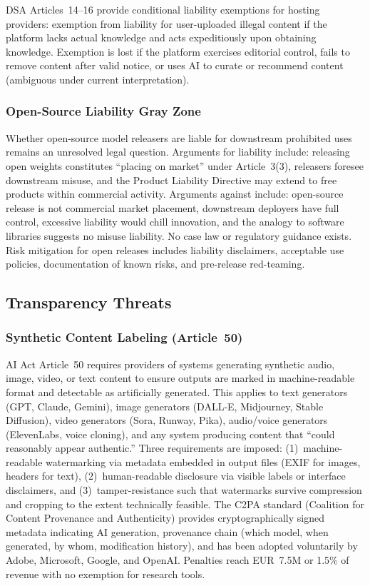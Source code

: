 \documentclass[11pt,a4paper]{article}
\begin{document}
DSA Articles~14--16 provide conditional liability exemptions for hosting providers: exemption from liability for user-uploaded illegal content if the platform lacks actual knowledge and acts expeditiously upon obtaining knowledge. Exemption is lost if the platform exercises editorial control, fails to remove content after valid notice, or uses AI to curate or recommend content (ambiguous under current interpretation).

\subsubsection{Open-Source Liability Gray Zone}

Whether open-source model releasers are liable for downstream prohibited uses remains an unresolved legal question. Arguments for liability include: releasing open weights constitutes ``placing on market'' under Article~3(3), releasers foresee downstream misuse, and the Product Liability Directive may extend to free products within commercial activity. Arguments against include: open-source release is not commercial market placement, downstream deployers have full control, excessive liability would chill innovation, and the analogy to software libraries suggests no misuse liability. No case law or regulatory guidance exists. Risk mitigation for open releases includes liability disclaimers, acceptable use policies, documentation of known risks, and pre-release red-teaming.

\subsection{Transparency Threats}

\subsubsection{Synthetic Content Labeling (Article~50)}

AI Act Article~50 requires providers of systems generating synthetic audio, image, video, or text content to ensure outputs are marked in machine-readable format and detectable as artificially generated. This applies to text generators (GPT, Claude, Gemini), image generators (DALL-E, Midjourney, Stable Diffusion), video generators (Sora, Runway, Pika), audio/voice generators (ElevenLabs, voice cloning), and any system producing content that ``could reasonably appear authentic.'' Three requirements are imposed: (1)~machine-readable watermarking via metadata embedded in output files (EXIF for images, headers for text), (2)~human-readable disclosure via visible labels or interface disclaimers, and (3)~tamper-resistance such that watermarks survive compression and cropping to the extent technically feasible. The C2PA standard (Coalition for Content Provenance and Authenticity) provides cryptographically signed metadata indicating AI generation, provenance chain (which model, when generated, by whom, modification history), and has been adopted voluntarily by Adobe, Microsoft, Google, and OpenAI. Penalties reach EUR~7.5M or 1.5\% of revenue with no exemption for research tools.
\end{document}

